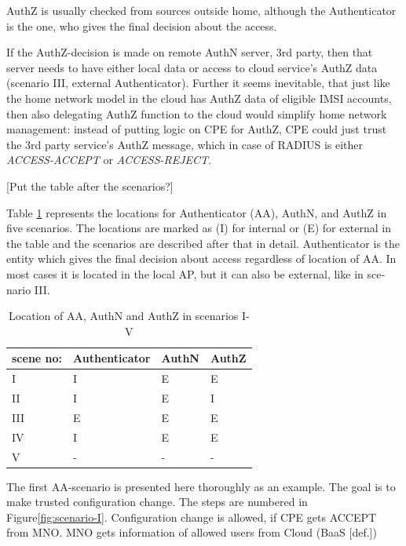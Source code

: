 \documentclass[12pt,a4paper,english]{tutthesis}
\begin{document}
\begin{otherlanguage}{english}
AuthZ is usually checked from sources outside home, 
although the Authenticator is the one, who
gives the final decision about the access.

If the AuthZ-decision is made on remote AuthN server, 3rd party, 
then that server needs to have either local data or access to 
cloud service's AuthZ data (scenario III, external Authenticator).
Further it seems inevitable, that just like the home network model
in the cloud has  AuthZ data of eligible IMSI accounts,
then also delegating AuthZ function to the cloud would simplify home network 
management: instead of putting logic on CPE for AuthZ, CPE
could just trust the 3rd party service's AuthZ message, which in case
of RADIUS is either \emph{ACCESS-ACCEPT} or \emph{ACCESS-REJECT}.


[Put the table after the scenarios?]

Table \ref{table-scenarios} represents the locations for Authenticator (AA),
AuthN, and AuthZ in five scenarios. The locations are marked as (I)
for internal or (E) for external in the table and the scenarios are
described after that in detail. Authenticator is the entity which
gives the final decision about access regardless of location of AA.
In most cases it is located in the local AP, but it can also be
external, like in scenario III. 

\begin{table}[htb]
\caption{\label{table-scenarios}Location of AA, AuthN and AuthZ in scenarios I-V}
\centering
\begin{tabular}{llll}
scene no: & Authenticator & AuthN & AuthZ\\
\hline
I & I & E & E\\
II & I & E & I\\
III & E & E & E\\
IV & I & E & E\footnotemark\\
V & - & - & -\\
\end{tabular}
\end{table}


\label{scenario-i}
The first AA-scenario is presented here thoroughly as an example.
The goal is to make trusted configuration change. 
The steps are numbered in Figure\ref{fig:scenario-I}.
Configuration change is allowed, if CPE gets ACCEPT from MNO.  MNO gets
information of allowed users from Cloud (BaaS [def.])



\end{otherlanguage}
\end{document}
